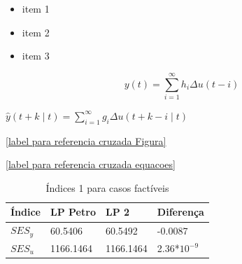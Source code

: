 
\begin{itemize}
	\item item 1
	\item item 2
	\item item 3
\end{itemize}

\begin{equation}
	\label{label para referencia cruzada equacoes} 
	y(t)=\sum_{i=1}^{\infty}h_i\Delta u(t-i)
\end{equation}

$\hat{y}(t+k\mid t)= \sum^\infty_{i=1} g_i \Delta u(t+k-i\mid t)$


\cite{Camacho2007} 

\ref{label para referencia cruzada Figura}

\ref{label para referencia cruzada equacoes}



\begin{table}[h]
\begin{center}
     \caption{Índices 1 para casos factíveis}
     \begin{tabular}{| l | l | l | l |}
     \hline Índice & LP Petro & LP 2 & Diferença\\ 
     \hline $SES_y$& 60.5406 & 60.5492 & -0.0087\\
     \hline $SES_u$& 1166.1464 & 1166.1464 & 2.36*$10^{-9}$ \\
     \hline
     \end{tabular}
\label{table:indices1}
\end{center}
\end{table}